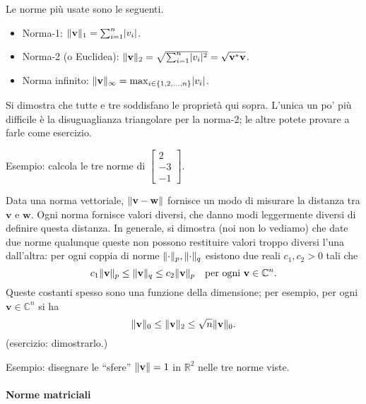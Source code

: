 \documentclass[a4paper]{report}
\DeclarePairedDelimiter{\abs}{\lvert}{\rvert}
\DeclarePairedDelimiter{\norm}{\lVert}{\rVert}
\theoremstyle{definiton}
\theoremstyle{remark}
\begin{document}
Le norme più usate sono le seguenti.

\begin{itemize}
    \item Norma-1: $\norm{\mathbf{v}}_1 = \sum_{i=1}^n \abs{v_i}$.
    \item Norma-2 (o Euclidea): $\norm{\mathbf{v}}_2 = \sqrt{\sum_{i=1}^n \abs{v_i}^2} = \sqrt{\mathbf{v}^*\mathbf{v}}$.
    \item Norma infinito: $\norm{\mathbf{v}}_\infty = \max_{i\in \{1,2,\dots,n\}} \abs{v_i}$.
\end{itemize}
Si dimostra che tutte e tre soddisfano le proprietà qui sopra. L'unica un po' più difficile è la disuguaglianza triangolare per la norma-2; le altre potete provare a farle come esercizio.

Esempio: calcola le tre norme di $\begin{bmatrix}
    2\\-3\\-1
\end{bmatrix}$.

Data una norma vettoriale, $\norm{\mathbf{v}-\mathbf{w}}$ fornisce un modo di misurare la distanza tra $\mathbf{v}$ e $\mathbf{w}$. Ogni norma fornisce valori diversi, che danno modi leggermente diversi di definire questa distanza. In generale, si dimostra (noi non lo vediamo) che date due norme qualunque queste non possono restituire valori troppo diversi l'una dall'altra: per ogni coppia di norme $\norm{\cdot}_p,\norm{\cdot}_q$ esistono due reali $c_1,c_2 > 0$ tali che
\[
c_1\norm{\mathbf{v}}_p \leq \norm{\mathbf{v}}_q \leq c_2 \norm{\mathbf{v}}_p \quad \text{per ogni $\mathbf{v}\in\mathbb{C}^n$}.
\]
Queste costanti spesso sono una funzione della dimensione; per esempio, per ogni $\mathbf{v}\in\mathbb{C}^n$ si ha
\[
\norm{\mathbf{v}}_0 \leq \norm{\mathbf{v}}_2 \leq \sqrt{n}\norm{\mathbf{v}}_0.
\]
(esercizio: dimostrarlo.)

Esempio: disegnare le ``sfere'' $\norm{\mathbf{v}}=1$ in $\mathbb{R}^2$ nelle tre norme viste.

\paragraph{Norme matriciali}
\end{document}
